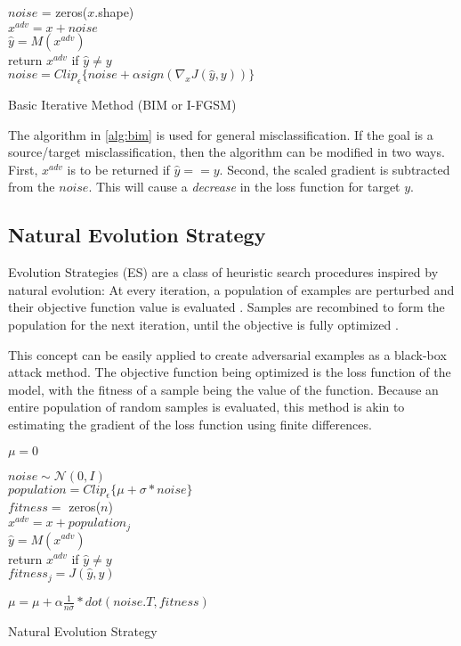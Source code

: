\documentclass[12pt]{article}
\begin{document}
\begin{algorithm}[htbp]
\SetAlgoLined
{}
	$noise$ = zeros($x$.shape) \\
     {
        $x^{adv} = x + noise$ \\
		$\hat{y} = M(x^{adv})$ \\
		return $x^{adv}$ if $\hat{y} \neq y$ \\
		$noise = Clip_{\epsilon}\{noise + \alpha sign(\nabla_{x}J(\hat{y}, y))\}$
    }
\caption{Basic Iterative Method (BIM or I-FGSM)}
\label{alg:bim}
\end{algorithm}

The algorithm in \ref{alg:bim} is used for general misclassification.
If the goal is a source/target misclassification, then the algorithm can be modified in two ways.
First, $x^{adv}$ is to be returned if $\hat{y} == y$.
Second, the scaled gradient is subtracted from the $noise$.
This will cause a \emph{decrease} in the loss function for target $y$.

\subsection{Natural Evolution Strategy}
Evolution Strategies (ES) are a class of heuristic search procedures inspired by natural evolution:
At every iteration, a population of examples are perturbed and their objective function value is evaluated \cite{salimans2017evolution}.
Samples are recombined to form the population for the next iteration, until the objective is fully optimized \cite{salimans2017evolution}.

This concept can be easily applied to create adversarial examples as a black-box attack method.
The objective function being optimized is the loss function of the model, with the fitness of a sample being the value of the function.
Because an entire population of random samples is evaluated, this method is akin to estimating the gradient of the loss function using finite differences.

\begin{algorithm}[htbp]
\SetAlgoLined
{}
	$\mu = 0$ \\
     {
        $noise \sim \mathcal{N}(0, I)$ \\
		$population = Clip_{\epsilon}\{\mu + \sigma * noise\}$ \\
		$fitness = $ zeros($n$) \\
		 {
			$x^{adv} = x + population_j$ \\
			$\hat{y} = M(x^{adv})$ \\
			return $x^{adv}$ if $\hat{y} \neq y$ \\
			$fitness_j = J(\hat{y}, y)$ \\
		}

        $\mu = \mu + \alpha \frac{1}{n\sigma} * dot(noise.T, fitness)$ \\
    }
\caption{Natural Evolution Strategy}
\label{alg:nes}
\end{algorithm}
\end{document}
